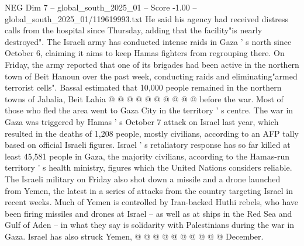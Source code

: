 \begin{textsample}{NEG Dim 7 – global\_south\_2025\_01 – Score -1.00 – global\_south\_2025\_01/119619993.txt}
He said his agency had received distress calls from the hospital since Thursday, adding that the facility"is nearly destroyed".
The Israeli army has conducted intense raids in Gaza ' s north since October 6, claiming it aims to keep Hamas fighters from regrouping there.
On Friday, the army reported that one of its brigades had been active in the northern town of Beit Hanoun over the past week, conducting raids and eliminating"armed terrorist cells".
Bassal estimated that 10,000 people remained in the northern towns of Jabalia, Beit Lahia @ @ @ @ @ @ @ @ @ @ before the war.
Most of those who fled the area went to Gaza City in the territory ' s centre.
The war in Gaza was triggered by Hamas ' s October 7 attack on Israel last year, which resulted in the deaths of 1,208 people, mostly civilians, according to an AFP tally based on official Israeli figures.
Israel ' s retaliatory response has so far killed at least 45,581 people in Gaza, the majority civilians, according to the Hamas-run territory ' s health ministry, figures which the United Nations considers reliable.
The Israeli military on Friday also shot down a missile and a drone launched from Yemen, the latest in a series of attacks from the country targeting Israel in recent weeks.
Much of Yemen is controlled by Iran-backed Huthi rebels, who have been firing missiles and drones at Israel -- as well as at ships in the Red Sea and Gulf of Aden -- in what they say is solidarity with Palestinians during the war in Gaza.
Israel has also struck Yemen, @ @ @ @ @ @ @ @ @ @ December.

\end{textsample}
